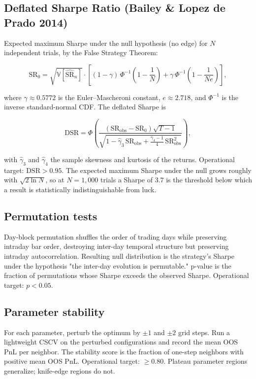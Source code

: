 \documentclass[10pt,letterpaper]{article}
\begin{document}
\subsection{Deflated Sharpe Ratio (Bailey \& Lopez de Prado 2014)}

Expected maximum Sharpe under the null hypothesis (no edge) for $N$ independent trials, by the False Strategy Theorem:

\[
\text{SR}_0 = \sqrt{\mathbb{V}[\hat{\text{SR}}_n]} \cdot \left[(1 - \gamma)\,\Phi^{-1}\!\left(1 - \frac{1}{N}\right) + \gamma\,\Phi^{-1}\!\left(1 - \frac{1}{N e}\right)\right],
\]

where $\gamma \approx 0.5772$ is the Euler--Mascheroni constant, $e \approx 2.718$, and $\Phi^{-1}$ is the inverse standard-normal CDF. The deflated Sharpe is

\[
\text{DSR} = \Phi\!\left(\frac{(\text{SR}_\text{obs} - \text{SR}_0)\sqrt{T - 1}}{\sqrt{1 - \hat\gamma_3\,\text{SR}_\text{obs} + \tfrac{\hat\gamma_4 - 1}{4}\,\text{SR}_\text{obs}^2}}\right),
\]

with $\hat\gamma_3$ and $\hat\gamma_4$ the sample skewness and kurtosis of the returns. Operational target: $\text{DSR} > 0.95$. The expected maximum Sharpe under the null grows roughly with $\sqrt{2 \ln N}$, so at $N = 1{,}000$ trials a Sharpe of 3.7 is the threshold below which a result is statistically indistinguishable from luck.

\subsection{Permutation tests}

Day-block permutation shuffles the order of trading days while preserving intraday bar order, destroying inter-day temporal structure but preserving intraday autocorrelation. Resulting null distribution is the strategy's Sharpe under the hypothesis "the inter-day evolution is permutable." p-value is the fraction of permutations whose Sharpe exceeds the observed Sharpe. Operational target: $p < 0.05$.

\subsection{Parameter stability}

For each parameter, perturb the optimum by $\pm 1$ and $\pm 2$ grid steps. Run a lightweight CSCV on the perturbed configurations and record the mean OOS PnL per neighbor. The stability score is the fraction of one-step neighbors with positive mean OOS PnL. Operational target: $\geq 0.80$. Plateau parameter regions generalize; knife-edge regions do not.
\end{document}

